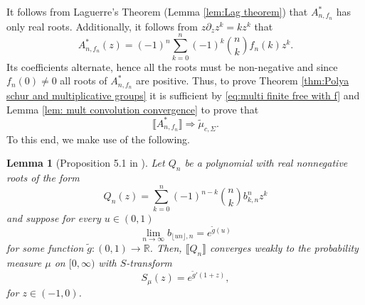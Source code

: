 \documentclass[reqno]{amsart}
\newcommand{\1}{\mathbf{1}}
\newcommand{\R}{\mathbb{R}}
\def\R{\mathbb{R}}
\theoremstyle{plain}
\newtheorem{lemma}[theorem]{Lemma}
\theoremstyle{definition}
\theoremstyle{remark}
\numberwithin{equation}{section}
\begin{document}
	It follows from Laguerre's Theorem (Lemma \ref{lem:Lag theorem}) that $A_{n,f_n}^{*}$ has only real roots. Additionally, it follows from  $z\partial_z z^k= kz^k$ that  \begin{equation}\label{eq:A*}
		A_{n,f_n}^{*}(z)=(-1)^{n}\sum_{k=0}^{n}(-1)^{k}\binom{n}{k}f_n(k)z^k.
	\end{equation} Its coefficients alternate, hence all the roots must be  non-negative and since $f_n(0)\neq 0$ all roots of $A_{n,f_n}^{*}$ are positive.
	Thus, to prove Theorem \ref{thm:Polya schur and multiplicative groups} it is sufficient by \eqref{eq:multi finite free with f} and Lemma \ref{lem: mult convolution convergence} to prove that \begin{equation}\label{eq:An*}
	\llbracket A_{n,f_n}^{*}\rrbracket\Rightarrow\tilde\mu_{c,\Sigma}.
	\end{equation}  
	To this end, we make use of the following. \begin{lemma}[Proposition 5.1 in \cite{Jalowy-Kabluchko-Marynych2025part2}]\label{lem:exp prof of conv power}
		Let $Q_{n}$ be a polynomial with real nonnegative roots of the form \begin{equation}
			Q_{n}(z)=\sum_{k=0}^{n}(-1)^{n-k}\binom{n}{k}b_{k,n}^nz^k
		\end{equation} and suppose for every $u\in (0,1)$ \begin{equation}\label{eq:Qprofile}
			\lim\limits_{n\rightarrow\infty} b_{\lfloor un\rfloor,n}=e^{\tilde{g}(u)}
		\end{equation} for some function $\tilde{g}:(0,1)\rightarrow\R$. Then, $\llbracket Q_{n}\rrbracket$ converges weakly to the probability measure $\mu$ on $[0,\infty)$ with $S$-transform \begin{equation}
			S_{\mu}(z)=e^{\tilde{g}'(1+z)},
		\end{equation} for $z\in(-1,0)$.
	\end{lemma}
	
\end{document}
